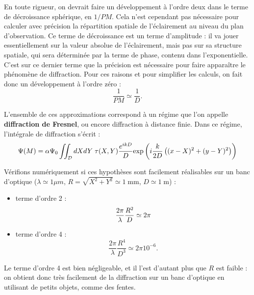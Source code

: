 \documentclass[11pt,a4paper]{report}
\begin{document}
En toute rigueur, on devrait faire un développement à l'ordre deux dans le terme de décroissance sphérique, en $1/PM$. Cela n'est cependant pas nécessaire pour calculer avec précision la répartition spatiale de l'éclairement au niveau du plan d'observation. Ce terme de décroissance est un terme d'amplitude : il va jouer essentiellement sur la valeur absolue de l'éclairement, mais pas sur sa structure spatiale, qui sera déterminée par la terme de phase, contenu dans l'exponentielle. C'est sur ce dernier terme que la précision est nécessaire pour faire apparaître le phénomène de diffraction. Pour ces raisons et pour simplifier les calculs, on fait donc un développement à l'ordre zéro :
\begin{equation}
	\frac{1}{PM} \simeq \frac{1}{D}.
\end{equation}

L'ensemble de ces approximations correspond à un régime que l'on appelle \textbf{diffraction de Fresnel}, ou encore diffraction à distance finie. Dans ce régime, l'intégrale de diffraction s'écrit :
\begin{equation}
	\Psi(M) =  \alpha \Psi_0 \iint_\mathcal{D} dXdY\; \tau(X,Y) \displaystyle{\frac{e^{ikD}}{D}}\displaystyle{\text{exp}\left(i\frac{k}{2D}\left( (x-X)^2 + (y-Y)^2 \right)\right)}\\
\end{equation}

Vérifions numériquement si ces hypothèses sont facilement réalisables sur un banc d'optique 
($\lambda \simeq 1 \mu m$, $R = \sqrt{X^2 + Y^2} \simeq 1\;\text{mm}$, $D \simeq 1\;\text{m}$) :\\
\begin{itemize}
	\item terme d'ordre 2 :
	\begin{equation}
		\frac{2\pi}{\lambda} \frac{R^2}{D} \simeq 2\pi\\
	\end{equation}
	
	\item terme d'ordre 4 :
	\begin{equation}
		\frac{2\pi}{\lambda} \frac{R^4}{D^3} \simeq 2\pi 10^{-6}.
	\end{equation}
\end{itemize}

Le terme d'ordre 4 est bien négligeable, et il l'est d'autant plus que $R$ est faible : on obtient donc très facilement de la diffraction sur un banc d'optique en utilisant de petits objets, comme des fentes.
\end{document}
